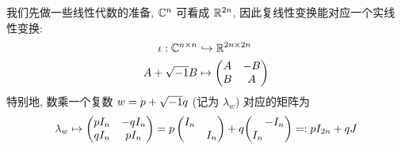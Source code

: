             我们先做一些线性代数的准备, $\mathbb{C}^n$ 可看成 $\mathbb{R}^{2n}$, 因此复线性变换能对应一个实线性变换:
            \begin{equation}\label{CnintoR2n}
                \begin{aligned}
                    \iota:\mathbb{C}^{n\times n}   &   \hookrightarrow\mathbb{R}^{2n\times 2n} \\
                    A + \sqrt{-1} B               &   \mapsto \begin{pmatrix} A & -B \\ B & A \end{pmatrix}
                \end{aligned}
            \end{equation}
            特别地, 数乘一个复数 $w=p+\sqrt{-1} q$ (记为 $\lambda_w$) 对应的矩阵为
            \begin{equation*}
                \lambda_{w}\mapsto \begin{pmatrix} pI_n & -qI_n \\ qI_n & pI_n \end{pmatrix} =
                p\begin{pmatrix} I_n & \\ & I_n \end{pmatrix} 
                + q{\setlength{\arraycolsep}{0.8pt} \begin{pmatrix} & -I_n \\ I_n & \end{pmatrix}} =: 
                pI_{2n} + qJ
            \end{equation*}

